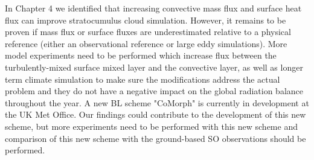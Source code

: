 In Chapter 4 we identified that increasing convective mass flux and surface
heat flux can improve stratocumulus cloud simulation. However, it remains
to be proven if mass flux or surface fluxes are underestimated relative to
a physical reference (either an observational reference or large eddy
simulations). More model experiments need to be performed which increase
flux between the turbulently-mixed surface mixed layer and the convective layer,
as well as longer term climate simulation to make sure the modifications
address the actual problem and they do not have a negative impact on the
global radiation balance throughout the year. A new BL scheme "CoMorph"
is currently in development at the UK Met Office. Our findings could contribute
to the development of this new scheme, but more experiments need to be performed
with this new scheme and comparison of this new scheme with the ground-based
SO observations should be performed.

\clearpage

